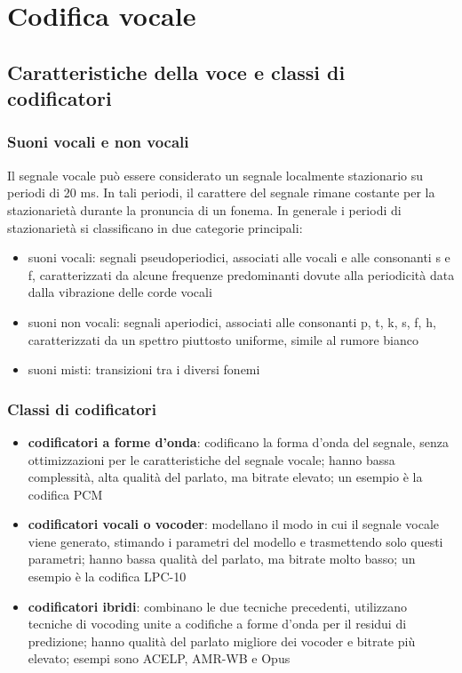 \section{Codifica vocale}
\subsection{Caratteristiche della voce e classi di codificatori}
\subsubsection*{Suoni vocali e non vocali}
Il segnale vocale può essere considerato un segnale localmente stazionario su periodi di 20 ms. In tali periodi, il carattere
del segnale rimane costante per la stazionarietà durante la pronuncia di un fonema. In generale i periodi di stazionarietà
si classificano in due categorie principali:
\begin{itemize}
	\item suoni vocali: segnali pseudoperiodici, associati alle vocali e alle consonanti s e f, caratterizzati da alcune
	frequenze predominanti dovute alla periodicità data dalla vibrazione delle corde vocali
	\item suoni non vocali: segnali aperiodici, associati alle consonanti p, t, k, s, f, h, caratterizzati da un
	spettro piuttosto uniforme, simile al rumore bianco
	\item suoni misti: transizioni tra i diversi fonemi
\end{itemize}

\subsubsection*{Classi di codificatori}
\begin{itemize}
	\item \textbf{codificatori a forme d'onda}: codificano la forma d'onda del segnale, senza ottimizzazioni per le
	caratteristiche del segnale vocale; hanno bassa complessità, alta qualità del parlato, ma bitrate elevato; un esempio
	è la codifica PCM
	\item \textbf{codificatori vocali o vocoder}: modellano il modo in cui il segnale vocale viene generato, stimando
	i parametri del modello e trasmettendo solo questi parametri; hanno bassa qualità del parlato, ma bitrate molto basso;
	un esempio è la codifica LPC-10
	\item \textbf{codificatori ibridi}: combinano le due tecniche precedenti, utilizzano tecniche di vocoding unite a
	codifiche a forme d'onda per il residui di predizione; hanno qualità del parlato migliore dei vocoder e bitrate più
	elevato; esempi sono ACELP, AMR-WB e Opus
\end{itemize}

